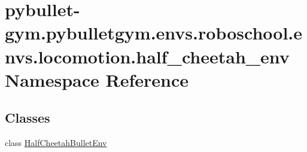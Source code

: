 \hypertarget{namespacepybullet-gym_1_1pybulletgym_1_1envs_1_1roboschool_1_1envs_1_1locomotion_1_1half__cheetah__env}{}\section{pybullet-\/gym.pybulletgym.\+envs.\+roboschool.\+envs.\+locomotion.\+half\+\_\+cheetah\+\_\+env Namespace Reference}
\label{namespacepybullet-gym_1_1pybulletgym_1_1envs_1_1roboschool_1_1envs_1_1locomotion_1_1half__cheetah__env}
\subsection*{Classes}
\begin{DoxyCompactItemize}
\item 
class \hyperlink{classpybullet-gym_1_1pybulletgym_1_1envs_1_1roboschool_1_1envs_1_1locomotion_1_1half__cheetah__env_1_1_half_cheetah_bullet_env}{Half\+Cheetah\+Bullet\+Env}
\end{DoxyCompactItemize}
